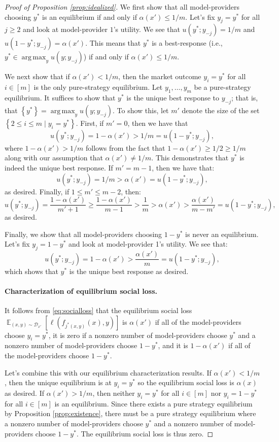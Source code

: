 \documentclass[letterpaper,11pt]{article}
\theoremstyle{plain}
\DeclareMathOperator*{\argmax}{arg\,max}
\DeclareMathOperator*{\E}{\mathbb{E}}
\begin{document}
\begin{proof}[Proof of Proposition \ref{prop:idealized}]
We first show that all model-providers choosing $y^*$ is an equilibrium if and only if $\alpha(x') \le 1/m$. Let's fix $y_j = y^*$ for all $j \ge 2$ and look at model-provider $1$'s utility. We see that $u(y^*; y_{-j}) = 1/m$ and $u(1-y^*; y_{-j}) = \alpha(x')$. This means that $y^*$ is a best-response (i.e., $y^* \in \argmax_y u(y; y_{-j})$) if and only if $\alpha(x') \le 1/m$. 

We next show that if $\alpha(x') < 1/m$, then the market outcome $y_i = y^*$ for all $i \in [m]$ is the only pure-strategy equilibrium. Let $y_1, \ldots, y_m$ be a pure-strategy equilibrium. It suffices to show that $y^*$ is the unique best response to $y_{-j}$; that is, that $\left\{y^*\right\} = \argmax_y u(y; y_{-j})$. To show this, let $m'$ denote the size of the set $\left\{2 \le i \le m \mid y_i = y^*\right\}$. First, if $m' = 0$, then we have that
\[u(y^*; y_{-j}) = 1 - \alpha(x') > 1/m = u(1 - y^*; y_{-j}),  \]
where $1- \alpha(x') > 1/m$ follows from the fact that $1 - \alpha(x') \ge 1/2 \ge 1/m$ along with our assumption that $\alpha(x') \neq 1/m$. This demonstrates that $y^*$ is indeed the unique best response. If $m' = m -1$, then we have that:
\[u(y^*; y_{-j}) = 1/m > \alpha(x') = u(1 - y^*; y_{-j}),  \] as desired. Finally, if $1 \le m' \le m-2$, then:
\[ u(y^*; y_{-j}) = \frac{1-\alpha(x')}{m' + 1} \ge \frac{1-\alpha(x')}{m-1} > \frac{1}{m} > \alpha(x') > \frac{\alpha(x')}{m - m'} = u(1-y^*; y_{-j}), \]
as desired. 

Finally, we show that all model-providers choosing $1-y^*$ is never an equilibrium. Let's fix $y_j = 1 - y^*$ and look at model-provider 1's utility. We see that:
\[ u(y^*; y_{-j}) = 1 - \alpha(x') > \frac{ \alpha(x')}{m} =u(1-y^*; y_{-j}), \]
which shows that $y^*$ is the unique best response as desired.


\paragraph{Characterization of equilibrium social loss.} It follows from \eqref{eq:socialloss} that the equilibrium social loss $\E_{(x,y) \sim \mathcal{D}_{x'}}[\ell(f_{j^*(x,y)}(x), y)]$ is $\alpha(x')$ if all of the model-providers choose $y_i = y^*$, it is zero if a nonzero number of model-providers choose $y^*$ and a nonzero number of model-providers choose $1-y^*$, and it is $1-\alpha(x')$ if all of the model-providers choose $1- y^*$.

Let's combine this with our equilibrium characterization results. If $\alpha(x') < 1/m$, then the unique equilibrium is at $y_i = y^*$ so the equilibrium social loss is $\alpha(x)$ as desired. If $\alpha(x') > 1/m$, then neither $y_i = y^*$ for all $i \in [m]$ nor $y_i = 1- y^*$ for all $i \in [m]$ is an equilibrium. Since there exists a pure strategy equilibrium by Proposition \ref{prop:existence}, there must be a pure strategy equilibrium where a nonzero number of model-providers choose $y^*$ and a nonzero number of model-providers choose $1-y^*$. The equilibrium social loss is thus zero. 


\end{proof}
\end{document}
